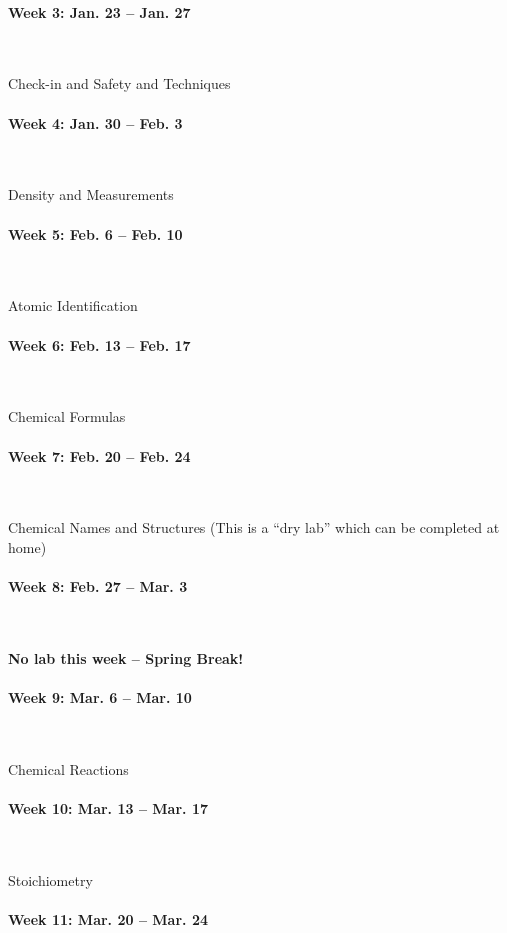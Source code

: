 \documentclass[12pt, letterpaper]{article}
\begin{document}
\paragraph{Week 3: Jan. 23 -- Jan. 27}~

Check-in and Safety and Techniques

\paragraph{Week 4: Jan. 30 -- Feb. 3}~

Density and Measurements

\paragraph{Week 5: Feb. 6 -- Feb. 10}~

Atomic Identification

\paragraph{Week 6: Feb. 13 -- Feb. 17}~

Chemical Formulas

\paragraph{Week 7: Feb. 20 -- Feb. 24}~

Chemical Names and Structures (This is a ``dry lab'' which can be completed at home)

\paragraph{Week 8: Feb. 27 -- Mar. 3}~

\textbf{No lab this week -- Spring Break!}

\paragraph{Week 9: Mar. 6 -- Mar. 10}~

Chemical Reactions

\paragraph{Week 10: Mar. 13 -- Mar. 17}~

Stoichiometry

\paragraph{Week 11: Mar. 20 -- Mar. 24}~
\end{document}
